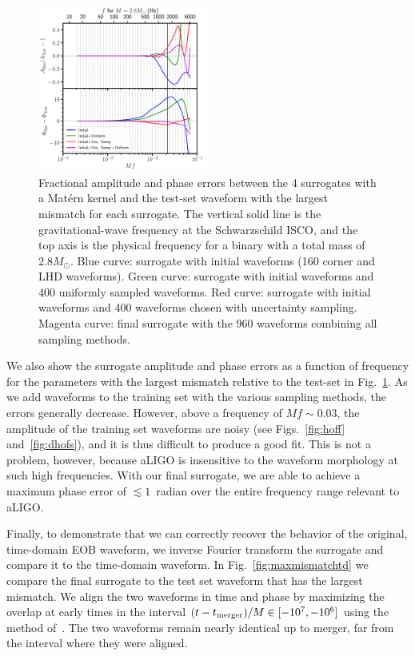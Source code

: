 \documentclass[prd,aps,letter,twocolumn,floatfix,notitlepage,nofootinbib]{revtex4-1}
\begin{document}
\begin{figure}[htb]
\centering
\includegraphics[width=0.49\textwidth]{htildemaxerror.pdf}
\caption{Fractional amplitude and phase errors between the 4 surrogates with a Mat\'{e}rn kernel and the test-set waveform with the largest mismatch for each surrogate. The vertical solid line is the gravitational-wave frequency at the Schwarzschild ISCO, and the top axis is the physical frequency for a binary with a total mass of $2.8M_\odot$. Blue curve: surrogate with initial waveforms (160 corner and LHD waveforms). Green curve: surrogate with initial waveforms and 400 uniformly sampled waveforms. Red curve: surrogate with initial waveforms and 400 waveforms chosen with uncertainty sampling. Magenta curve: final surrogate with the 960 waveforms combining all sampling methods.}
\label{fig:maxmismatchfd}
\end{figure}

We also show the surrogate amplitude and phase errors as a function of frequency for the parameters with the largest mismatch relative to the test-set in Fig.~\ref{fig:maxmismatchfd}. As we add waveforms to the training set with the various sampling methods, the errors generally decrease. However, above a frequency of $Mf \sim 0.03$, the amplitude of the training set waveforms are noisy (see Figs.~\ref{fig:hoff} and~\ref{fig:dhofs}), and it is thus difficult to produce a good fit. This is not a problem, however, because aLIGO is insensitive to the waveform morphology at such high frequencies. With our final surrogate, we are able to achieve a maximum phase error of $\lesssim 1$~radian over the entire frequency range relevant to aLIGO.

Finally, to demonstrate that we can correctly recover the behavior of the original, time-domain EOB waveform, we inverse Fourier transform the surrogate and compare it to the time-domain waveform. In Fig.~\ref{fig:maxmismatchtd} we compare the final surrogate to the test set waveform that has the largest mismatch. We align the two waveforms in time and phase by maximizing the overlap at early times in the interval $(t-t_{\rm merger})/M \in [-10^7, -10^6]$ using the method of~\cite{ReadMarkakisShibata2009}. The two waveforms remain nearly identical up to merger, far from the interval where they were aligned.
\end{document}
